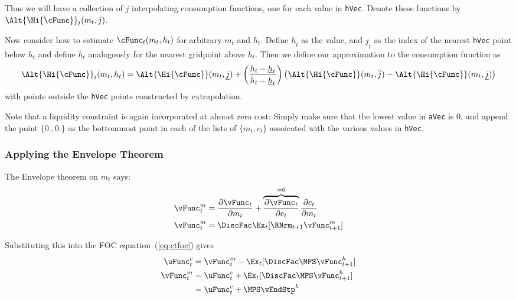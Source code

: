 \documentclass[\econtexRoot/SolvingMicroDSOPs]{subfiles}
\begin{document}
Thus we will have a collection of $j$ interpolating consumption
functions, one for each value in \texttt{hVec}.  Denote these
functions by $\Alt{\Hi{\cFunc}}_{t}(m_{t},j)$.

Now consider how to estimate $\cFunc_{t}(m_{t},h_{t})$ for arbitrary
$m_{t}$ and $h_{t}$.  Define $\underline{h}_{t}$ as the value, and
$\underline{j}_{t}$ as the index of the nearest \texttt{hVec} point
below $h_{t}$ and define $\bar{h}_{t}$ analogously for the nearest
gridpoint above $h_{t}$.  Then we define our approximation to the
consumption function as
\begin{displaymath}
  \Alt{\Hi{\cFunc}}_{t}(m_{t},h_{t}) =
  \Alt{\Hi{\cFunc}}(m_{t},\underline{j})+\left(\frac{h_{t}-\underline{h}_{t}}
    {\bar{h}_{t}-\underline{h}_{t}}\right)
  \left(\Alt{\Hi{\cFunc}}(m_{t},\overline{j})
    -\Alt{\Hi{\cFunc}}(m_{t},\underline{j})\right)
\end{displaymath}
with points outside the \texttt{hVec} points constructed by
extrapolation.

Note that a liquidity constraint is again incorporated at almost
zero cost: Simply make sure that the lowest value in
\texttt{aVec} is 0, and append the point $\{0.,0.\}$ as the
bottommost point in each of the lists of $\{{m}_{t},c_{t}\}$
assoicated with the various values in \texttt{hVec}.

\hypertarget{Applying-the-Envelope-Theorem}{}
\subsubsection{Applying the Envelope Theorem}
The Envelope theorem on $m_{t}$ says:
\begin{equation}\begin{gathered}\begin{aligned}
 \vFunc^{m}_{t}  & = \frac{\partial \vFunc_{t}}{\partial m_{t}} + \overbrace{\frac{\partial \vFunc_{t}}{\partial c_{t}}}^{=0}\frac{\partial c_{t}}{\partial m_{t}} \label{eq:vxt} \\ %
  \vFunc_{t}^m  & = \DiscFac  \Ex_{t} [\RNrm_{t+1} \vFunc_{t+1}^{m}] 
\end{aligned}\end{gathered}\end{equation}

Substituting this into the FOC equation~(\ref{eq:ctfoc}) gives
\begin{equation}\begin{gathered}\begin{aligned}
  \uFunc^{c}_{t}  & = \vFunc_{t}^{m}-\Ex_{t}[\DiscFac \MPS \vFunc_{t+1}^{h}] %
  \\ \vFunc_{t}^m  & = \uFunc^{c}_{t}+\Ex_{t}[\DiscFac \MPS \vFunc_{t+1}^{h}] \label{eq:vtfoc}
  \\            & = \uFunc^{c}_{t}+\MPS \vEndStp^{h} %
\end{aligned}\end{gathered}\end{equation}
\end{document}
